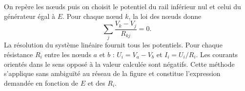 \begin{corrigebox}
On repère les nœuds puis on choisit le potentiel du rail inférieur
            nul et celui du générateur égal à $E$. Pour chaque nœud $k$, la loi des nœuds
            donne
            \[\sum_{j}\frac{V_k-V_j}{R_{kj}}=0.\]
            La résolution du système linéaire fournit tous les potentiels. Pour chaque
            résistance $R_i$ entre les nœuds $a$ et $b$ :
            $U_i=V_a-V_b$ et $I_i=U_i/R_i$. Les courants orientés dans le sens opposé à la
            valeur calculée sont négatifs. Cette méthode s'applique sans ambiguïté au
            réseau de la figure et constitue l'expression demandée en fonction de $E$ et
            des $R_i$.
\end{corrigebox}

